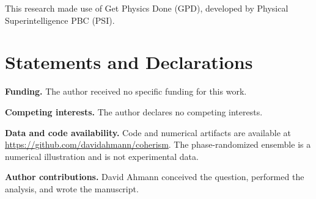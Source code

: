 \documentclass[aps,prd,twocolumn,superscriptaddress,nofootinbib,floatfix]{revtex4-2}
\begin{document}
\begin{acknowledgments}
This research made use of Get Physics Done (GPD), developed by Physical Superintelligence PBC (PSI).
\end{acknowledgments}

\section*{Statements and Declarations}

\textbf{Funding.} The author received no specific funding for this work.

\textbf{Competing interests.} The author declares no competing interests.

\textbf{Data and code availability.} Code and numerical artifacts are available at \url{https://github.com/davidahmann/coherism}. The phase-randomized ensemble is a numerical illustration and is not experimental data.

\textbf{Author contributions.} David Ahmann conceived the question, performed the analysis, and wrote the manuscript.



\end{document}
